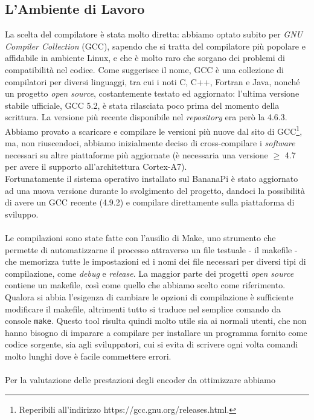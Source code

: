 \subsection{L'Ambiente di Lavoro}
La scelta del compilatore è stata molto diretta: abbiamo 
optato subito per 
\emph{GNU Compiler Collection} (GCC), sapendo che si tratta del compilatore più 
popolare e affidabile in ambiente Linux, e che è molto raro che sorgano dei 
problemi di compatibilità nel codice. Come suggerisce il nome, GCC è una 
collezione di compilatori per diversi linguaggi, tra cui i noti C, C++, Fortran 
e Java, nonché un progetto \emph{open source}, costantemente testato ed 
aggiornato: 
l'ultima versione stabile ufficiale, GCC 5.2, è stata rilasciata poco prima 
del momento della scrittura. La versione più recente disponibile nel 
\emph{repository} era però la 4.6.3. Abbiamo provato a 
scaricare e compilare le versioni più nuove dal sito di 
GCC\footnote{Reperibili all'indirizzo https://gcc.gnu.org/releases.html.}, ma, 
non riuscendoci, abbiamo
inizialmente deciso di cross-compilare i \emph{software} necessari su altre
piattaforme più aggiornate (è necessaria una versione $\geq$ 4.7 per avere il
supporto all'architettura Cortex-A7). \\
Fortunatamente il sistema operativo installato sul BananaPi è stato aggiornato
ad una nuova versione durante lo svolgimento del progetto, dandoci la 
possibilità di avere un GCC recente (4.9.2) e compilare direttamente sulla
piattaforma di sviluppo.
\\ \\
Le compilazioni sono state fatte con l'ausilio di Make, 
uno strumento 
che permette di automatizzarne il processo attraverso un file 
testuale - il makefile - che memorizza tutte le impostazioni ed i nomi dei file 
necessari per diversi tipi di compilazione, come \emph{debug} e \emph{release}. 
La maggior 
parte dei progetti \emph{open source} contiene un makefile, così come quello 
che 
abbiamo scelto come riferimento. Qualora si abbia l'esigenza di cambiare le 
opzioni di 
compilazione è sufficiente modificare il makefile, altrimenti tutto si traduce 
nel semplice comando da console \verb|make|. Questo tool risulta quindi molto 
utile sia ai normali utenti, che non hanno bisogno di imparare a compilare per 
installare un 
programma fornito come codice sorgente, sia agli sviluppatori, cui 
si evita di scrivere ogni volta 
comandi molto lunghi dove è facile commettere errori.
\\ \\
Per la valutazione delle prestazioni degli encoder da ottimizzare abbiamo 
